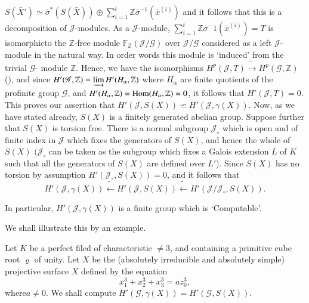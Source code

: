 $S(\bar{X}') \simeq \bar{\sigma}^* (S(\bar{X})) \oplus
\sum\limits_{i=1}^{t} \mathbb{Z} \bar{\sigma}^{-1} (\bar{x}^{(i)})$ and
it follows that this is a decomposition of $\mathscr{J}$-modules. As
a $\mathscr{J}$-module, $\sum\limits_{i=1}^{t} \mathbb{Z}
\bar{\sigma}^-1 (\bar{x}^{(i)})=T$ is isomorphic\pageoriginale to the
$\mathbb{Z}$-free module $\mathbb{F}_{\mathbb{Z}}(\mathscr{J}/
\mathscr{G})$ over 
$\mathscr{J}/ \mathscr{G}$ considered as a left $\mathscr{J}$-module
in the natural way. In order words this module is `induced' from the
trivial $\mathscr{G}$- module $\mathbb{Z}$. Hence, we have the
isomorphisms $H^p (\mathscr{J}, T)\tilde{\to} H^p (\mathscr{G},
\mathbb{Z})$ (\cite{key21}), and since $H'(\mathscr{G},\mathbb{Z})= \varinjlim
H' (H_\alpha , \mathbb{Z})$ where $H_\alpha$ are  finite quotients of
the profinite group $\mathscr{G}$, and $H' (H_\alpha, \mathbb{Z})= \operatorname{Hom}
(H_\alpha , \mathbb{Z})=0$, it follows that $H' (\mathscr{J},
T)=0$. This proves our assertion that $H' (\mathscr{J},
S(X))\backsimeq H' (\mathscr{J}, \gamma (X))$. Now, as we have stated
already, $S(X)$ is a finitely generated abelian group. Suppose
further that $S(X)$ is torsion free. There is a normal subgroup
$\mathscr{J}_\circ$ which is open and of finite index in $\mathscr{J}$
which fixes the generators of $S(X)$, and hence the whole of $S(X)$
$(\mathscr{J}_\circ$ can be taken as the subgroup which fixes a Galois
extension $L$ of $K$ such that all the generators of $S(X)$ are
defined over $L'$). Since $S(X)$ has no torsion by assumption $H'
(\mathscr{J}_\circ, S(X))=0$, and it follows that 
$$
H' (\mathscr{J}, \gamma (X))\tilde{\leftarrow} H'
(\mathscr{J}, S(X))\tilde{\leftarrow} H' (\mathscr{J}/
\mathscr{J}_\circ,S(X)). 
$$

In particular, $H' (\mathscr{J}, \gamma (X))$ is a finite group which
is `Computable'. 

We shall illustrate this by an example.

Let $K$ be a perfect filed of characteristic $\neq 3$, and containing
a primitive cube root $\varrho$ of unity. Let $X$ be the (absolutely
irreducible and absolutely simple) projective surface $X$ defined by
the equation 
\begin{equation*}
  x^3_1 + x^3_2 + x^3_3 = a z^3_0, \tag{$*$}
\end{equation*}
where\pageoriginale $a \neq 0$. We shall compute $H' (\mathscr{G},
\gamma (X))= H' (\mathscr{G}, S(X))$. 

